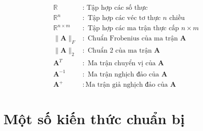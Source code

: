 \documentclass[12pt,a4paper,oneside]{report}
\numberwithin{equation}{section}
\begin{document}
$$
\begin{array}{ll}
	\mathbb{R} & : \text { Tập hợp các số thực } \\
	\mathbb{R}^n & : \text { Tập hợp các véc tơ thực } n \text { chiều } \\
	\mathbb{R}^{n \times m} & : \text { Tập hợp các ma trận thực cấp } n \times m \\
	\|\mathbf{A}\|_F & : \text { Chuẩn Frobenius của ma trận } \mathbf{A} \\
	\|\mathbf{A}\|_2 & : \text { Chuẩn } 2 \text { của ma trận } \mathbf{A} \\
	\mathbf{A}^T & : \text { Ma trận chuyển vị của } \mathbf{A} \\
	\mathbf{A}^{-1} & : \text { Ma trận nghịch đảo của } \mathbf{A} \\
	\mathbf{A}^{+} & : \text {Ma trận giả nghịch đảo của } \mathbf{A}
\end{array}
$$
\chapter{Một số kiến thức chuẩn bị}
\end{document}

